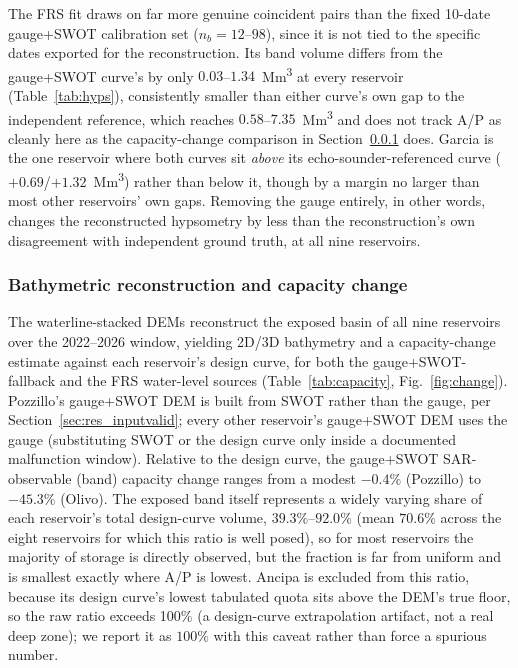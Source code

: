 The FRS fit draws on far more genuine coincident pairs than the fixed 10-date gauge+SWOT
calibration set ($n_b=12$--$98$), since it is not tied to the specific dates exported for the
reconstruction. Its band volume differs from the gauge+SWOT curve's by only
$0.03$--$1.34$~\si{Mm^3} at every reservoir (Table~\ref{tab:hyps}), consistently smaller
than either curve's own gap to the independent reference, which reaches $0.58$--$7.35$~\si{Mm^3}
and does not track A/P as cleanly here as the capacity-change comparison in
Section~\ref{sec:res_dem} does. Garcia is the one reservoir where both curves sit
\emph{above} its echo-sounder-referenced curve ($+0.69$/$+1.32$~\si{Mm^3}) rather than below
it, though by a margin no larger than most other reservoirs' own gaps. Removing the gauge
entirely, in other words, changes the reconstructed hypsometry by less than the
reconstruction's own disagreement with independent ground truth, at all nine reservoirs.

\subsubsection{Bathymetric reconstruction and capacity change}
\label{sec:res_dem}
The waterline-stacked DEMs reconstruct the exposed basin of all nine reservoirs over the
2022--2026 window, yielding 2D/3D bathymetry and a capacity-change estimate against each
reservoir's design curve, for both the gauge+SWOT-fallback and the FRS water-level
sources (Table~\ref{tab:capacity}, Fig.~\ref{fig:change}). Pozzillo's gauge+SWOT DEM is built
from SWOT rather than the gauge, per Section~\ref{sec:res_inputvalid}; every other reservoir's
gauge+SWOT DEM uses the gauge (substituting SWOT or the design curve only inside a documented
malfunction window). Relative to the design curve, the gauge+SWOT SAR-observable (band)
capacity change ranges from a modest $-0.4\%$ (Pozzillo) to $-45.3\%$ (Olivo). The exposed
band itself represents a widely varying share of each reservoir's total design-curve volume,
$39.3\%$--$92.0\%$ (mean $70.6\%$ across the eight reservoirs for which this ratio is well
posed), so for most reservoirs the majority of storage is directly observed, but the
fraction is far from uniform and is smallest exactly where A/P is lowest. Ancipa is excluded
from this ratio, because its design curve's lowest tabulated quota sits above the DEM's true
floor, so the raw ratio exceeds 100\% (a design-curve extrapolation artifact, not a real deep
zone); we report it as $100\%$ with this caveat rather than force a spurious number.

